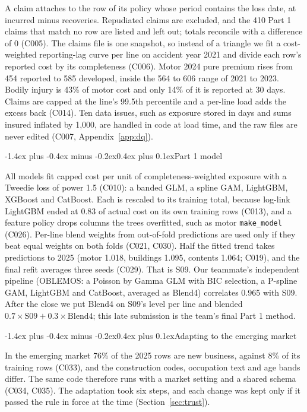 \documentclass[11pt,a4paper]{article}
\makeatletter
\renewcommand\subsection{\@startsection{subsection}{2}{\z@}%
  {-1.4ex plus -0.4ex minus -0.2ex}{0.4ex plus 0.1ex}{\normalfont\normalsize\bfseries}}
\newcommand{\code}[1]{\texttt{#1}}
\makeatother
\begin{document}
A claim attaches to the row of its policy whose period contains the loss date, at incurred minus recoveries.
Repudiated claims are excluded, and the 410 Part 1 claims that match no row are listed and left out; totals reconcile
with a difference of 0 (C005). The claims file is one snapshot, so instead of a triangle we fit a cost-weighted
reporting-lag curve per line on accident year 2021 and divide each row's reported cost by its completeness (C006).
Motor 2024 pure premium rises from 454 reported to 585 developed, inside the 564 to 606 range of 2021 to 2023. Bodily
injury is 43\% of motor cost and only 14\% of it is reported at 30 days. Claims are capped at the line's 99.5th
percentile and a per-line load adds the excess back (C014). Ten data issues, such as exposure stored in days and sums
insured inflated by 1,000, are handled in code at load time, and the raw files are never edited (C007,
Appendix~\ref{app:dq}).

\subsection{Part 1 model}

All models fit capped cost per unit of completeness-weighted exposure with a Tweedie loss of power 1.5 (C010): a
banded GLM, a spline GAM, LightGBM, XGBoost and CatBoost. Each is rescaled to its training total, because log-link
LightGBM ended at 0.83 of actual cost on its own training rows (C013), and a feature policy drops columns the trees
overfitted, such as motor \code{make\_model} (C026). Per-line blend weights from out-of-fold predictions are used only
if they beat equal weights on both folds (C021, C030). Half the fitted trend takes predictions to 2025 (motor 1.018,
buildings 1.095, contents 1.064; C019), and the final refit averages three seeds (C029). That is S09. Our teammate's
independent pipeline (OBLEMOS: a Poisson by Gamma GLM with BIC selection, a P-spline GAM, LightGBM and CatBoost,
averaged as Blend4) correlates 0.965 with S09. After the close we put Blend4 on S09's level per line and blended
$0.7\times\text{S09} + 0.3\times\text{Blend4}$; this late submission is the team's final Part 1 method.

\subsection{Adapting to the emerging market}

In the emerging market 76\% of the 2025 rows are new business, against 8\% of its training rows (C033), and the
construction codes, occupation text and age bands differ. The same code therefore runs with a market setting and a
shared schema (C034, C035). The adaptation took six steps, and each change was kept only if it passed the rule in
force at the time (Section~\ref{sec:trust}).
\end{document}
